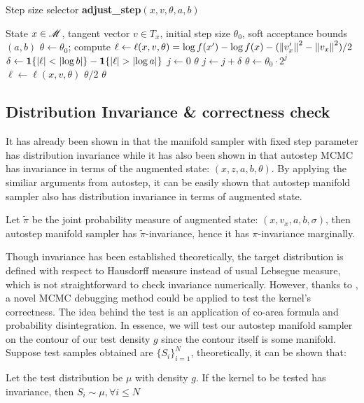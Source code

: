 \documentclass{article}
\begin{document}
\begin{algorithm}[!ht]
\caption{Step size selector \textbf{adjust\_step}$(x, v, \theta, a, b)$}
\label{algo:stepsize_selector}
\begin{algorithmic}[1]
\Require State $x \in \mathscr{M}$, tangent vector $v \in T_x$, initial step size $\theta_0$, soft acceptance bounds $(a, b)$ 
\State $\theta \gets \theta_0$; compute $\ell \gets \ell(x, v, \theta) = \log f(x') - \log f(x) - (\left\lVert v_x'\right\rVert^2-\left\lVert v_x\right\rVert^2) / 2$
\State $\delta \gets {\mathbf 1}\{\left|\ell\right| < \left|\log b\right|\} - {\mathbf 1}\{\left|\ell\right| > \left|\log a\right|\}$
\State $j \gets 0$
    \State \Return $\theta$
\EndIf
{}
    \State $j \gets j + \delta$
    \State $\theta \gets \theta_0 \cdot 2^j$
    \State $\ell \gets \ell(x, v, \theta)$
        \State \Return $\theta / 2$
        \State \Return $\theta$
    \EndIf
\EndWhile
\end{algorithmic}
\end{algorithm}


\subsection{Distribution Invariance \& correctness check}
It has already been shown in \cite{manifoldparent} that the manifold sampler with fixed step parameter has distribution invariance while it has also been shown in \cite{autostep} that autostep MCMC has invariance in terms of the augmented state: $(x, z, a, b, \theta)$. By applying the similiar arguments from autostep, it can be easily shown that autostep manifold sampler also has distribution invariance in terms of augmented state.
\begin{proposition}\label{prop:invariance}
Let $\tilde{\pi}$ be the joint probability measure of augmented state: $(x, v_x, a, b, \sigma)$, then autostep manifold sampler has $\tilde{\pi}$-invariance, hence it has $\pi$-invariance marginally.
\end{proposition}  
Though invariance has been established theoretically, the target distribution is defined with respect to Hausdorff measure instead of usual Lebsegue measure, which is not straightforward to check invariance numerically. However, thanks to \cite{ratest}, a novel MCMC debugging method could be applied to test the kernel's correctness. The idea behind the test is an application of co-area formula and probability disintegration. In essence, we will test our autostep manifold sampler on the contour of our test density $g$ since the contour itself is some manifold. Suppose test samples obtained are $\{S_i\}_{i=1}^N$, theoretically, it can be shown that:
\begin{theorem}\label{thm:ratest}
Let the test distribution be $\mu$ with density $g$. If the kernel to be tested has invariance, then $S_i \sim \mu, \forall i \leq N$
\end{theorem} 
\end{document}

